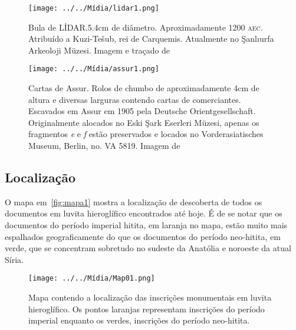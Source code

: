 \begin{figure}[htb]
	\begin{center}
		\texttt{[image: ../../Mídia/lidar1.png]}
	\end{center}
	\caption{Bula de LİDAR.\@ 5.4cm de diâmetro. Aproximadamente 1200 \textsc{aec}.
		Atribuído a Kuzi-Tešub, rei de Carquemis.
		Atualmente no Şanlıurfa Arkeoloji Müzesi.
		Imagem e traçado de~\citet[\emph{plate} 328]{CHLI13}}\label{fig:lidar1}
	\begin{center}
		\texttt{[image: ../../Mídia/assur1.png]}
	\end{center}
	\caption{Cartas de Assur. Rolos de chumbo de aproximadamente 4cm de altura e
		diversas larguras contendo cartas de comerciantes.
		Escavados em Assur em 1905 pela Deutsche Orientgesellschaft.
		Originalmente alocados no Eski Şark Eserleri Müzesi, apenas os
		fragmentos \emph{e} e \emph{f} estão preservados e locados no
		Vorderasiatisches Museum, Berlin, no. VA 5819.
		Imagem de~\citet[\emph{plate} 306]{CHLI13}
	}\label{fig:assur1}
\end{figure}

\clearpage

\subsection{Localização}

O mapa em~\autoref{fig:mapa1} mostra a localização de descoberta de todos os
documentos em luvita hieroglífico encontrados até hoje.
É de se notar que os documentos do período imperial hitita, em laranja no
mapa, estão muito mais espalhados geograficamente do que os documentos do
período neo-hitita, em verde, que se concentram sobretudo no sudeste da Anatólia
e noroeste da atual Síria.

\begin{figure}[ht!]
	\begin{center}
		\texttt{[image: ../../Mídia/Map01.png]}
	\end{center}
	\caption{Mapa contendo a localização das inscrições monumentais em luvita
		hieroglífico. Os pontos laranjas representam inscrições do período imperial
		enquanto os verdes, inscrições do período neo-hitita.}\label{fig:mapa1}
\end{figure}
